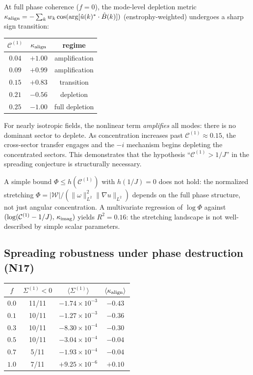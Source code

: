 \documentclass[11pt]{article}
\theoremstyle{definition}
\newcommand{\cC}{\mathcal{C}}
\begin{document}
At full phase coherence ($f=0$), the mode-level
depletion metric
$\kappa_{\rm align} = -\sum_k w_k
\cos(\arg[\hat u(k)^*\cdot\hat B(k)])$
(enstrophy-weighted) undergoes a sharp sign
transition:
\begin{center}
\begin{tabular}{@{}ccc@{}}
\toprule
$\cC^{(1)}$ & $\kappa_{\rm align}$ & regime \\
\midrule
$0.04$ & $+1.00$ & amplification \\
$0.09$ & $+0.99$ & amplification \\
$0.15$ & $+0.83$ & transition \\
$0.21$ & $-0.56$ & depletion \\
$0.25$ & $-1.00$ & full depletion \\
\bottomrule
\end{tabular}
\end{center}

For nearly isotropic fields, the nonlinear term
\emph{amplifies} all modes: there is no dominant
sector to deplete.  As concentration increases past
$\cC^{(1)}\approx 0.15$, the cross-sector transfer
engages and the $-i$ mechanism begins depleting the
concentrated sectors.  This demonstrates that the
hypothesis ``$\cC^{(1)}>1/J$'' in the spreading
conjecture is structurally necessary.

A simple bound $\Phi\leq h(\cC^{(1)})$ with
$h(1/J)=0$ does not hold: the normalized stretching
$\Phi = |\mathcal{W}|/(\|\omega\|_{L^2}^2
\|\nabla u\|_{L^2})$ depends on the full phase
structure, not just angular concentration.
A multivariate regression of $\log\Phi$ against
$(\log(\cC^{(1)}-1/J),\,\kappa_{\rm imag})$ yields
$R^2=0.16$: the stretching landscape is not
well-described by simple scalar parameters.


\subsection{Spreading robustness under phase
destruction (N17)}
\label{sec:robustness}

\begin{center}
\begin{tabular}{@{}cccc@{}}
\toprule
$f$ & $\Sigma^{(1)}<0$ & $\langle\Sigma^{(1)}\rangle$
  & $\langle\kappa_{\rm align}\rangle$ \\
\midrule
$0.0$ & 11/11 & $-1.74\times 10^{-3}$ & $-0.43$ \\
$0.1$ & 10/11 & $-1.27\times 10^{-3}$ & $-0.36$ \\
$0.3$ & 10/11 & $-8.30\times 10^{-4}$ & $-0.30$ \\
$0.5$ & 10/11 & $-3.04\times 10^{-4}$ & $-0.04$ \\
$0.7$ &  5/11 & $-1.93\times 10^{-4}$ & $-0.04$ \\
$1.0$ &  7/11 & $+9.25\times 10^{-6}$ & $+0.10$ \\
\bottomrule
\end{tabular}
\end{center}
\end{document}
